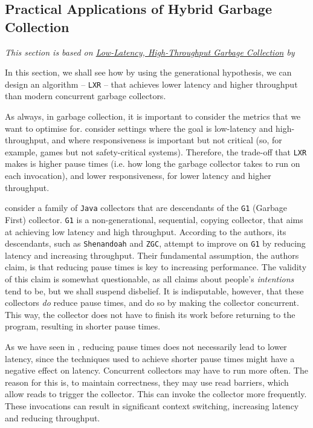 \subsection{Practical Applications of Hybrid Garbage Collection\optional}
\textit{This section is based on \href{https://dl.acm.org/doi/pdf/10.1145/3519939.3523440}{Low-Latency, High-Throughput Garbage Collection} by} \citet{zhao-2022}

In this section, we shall see how by using the generational hypothesis, we can design an algorithm -- \texttt{LXR} -- that achieves lower latency and higher throughput than modern concurrent garbage collectors.

As always, in garbage collection, it is important to consider the metrics that we want to optimise for. \citet{zhao-2022} consider settings where the goal is low-latency and high-throughput, and where responsiveness is important but not critical (so, for example, games but not safety-critical systems). Therefore, the trade-off that \texttt{LXR} makes is higher pause times (i.e. how long the garbage collector takes to run on each invocation), and lower responsiveness, for lower latency and higher throughput. 

\citet{zhao-2022} consider a family of \texttt{Java} collectors that are descendants of the \texttt{G1} (Garbage First) collector. \texttt{G1} is a non-generational, sequential, copying collector, that aims at achieving low latency and high throughput. According to the authors, its descendants, such as \texttt{Shenandoah} and \texttt{ZGC}, attempt to improve on \texttt{G1} by reducing latency and increasing throughput. Their fundamental assumption, the authors claim, is that reducing pause times is key to increasing performance. The validity of this claim is somewhat questionable, as all claims about people's \textit{intentions} tend to be, but we shall suspend disbelief. It is indisputable, however, that these collectors \textit{do} reduce pause times, and do so by making the collector concurrent. This way, the collector does not have to finish its work before returning to the program, resulting in shorter pause times. 

As we have seen in , reducing pause times does not necessarily lead to lower latency, since the techniques used to achieve shorter pause times might have a negative effect on latency. Concurrent collectors may have to run more often. The reason for this is, to maintain correctness, they may use read barriers, which allow reads to trigger the collector. This can invoke the collector more frequently. These invocations can result in significant context switching, increasing latency and reducing throughput.

